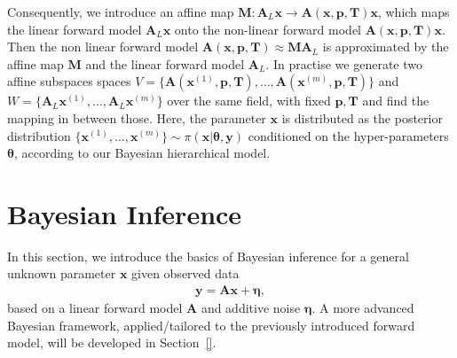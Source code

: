 Consequently, we introduce an affine map $ \bm{M}:\bm{A}_L \bm{x} \rightarrow \bm{A}(\bm{x},  \bm{p},\bm{T}) \bm{x}$, which maps the linear forward model $\bm{A}_L \bm{x}$ onto the non-linear forward model $\bm{A}(\bm{x},  \bm{p},\bm{T}) \bm{x}$.
Then the non linear forward model $\bm{A}(\bm{x},  \bm{p},\bm{T}) \approx \bm{M} \bm{A}_L$ is approximated by the affine map $\bm{M}$ and the linear forward model $\bm{A}_L$.
In practise we generate two affine subspaces spaces $V = \big\{ \bm{A}(\bm{x}^{(1)}, \bm{p,T}), \dots ,\bm{A}(\bm{x}^{(m)}, \bm{p,T})\big\} $ and $W = \big\{ \bm{A}_L\bm{x}^{(1)}, \dots ,\bm{A}_L\bm{x}^{(m)}\big\}$ over the same field, with fixed $\bm{p,T}$ and find the mapping in between those.
Here, the parameter $\bm{x}$ is distributed as the posterior distribution $\big\{  \bm{x}^{(1)} , \dots, \bm{x}^{(m)} \big\} \sim \pi(\bm{x}|\bm{\theta},\bm{y})$ conditioned on the hyper-parameters $\bm{\theta}$, according to our Bayesian hierarchical model.


\section{Bayesian Inference}
\label{sec:bayes}
In this section, we introduce the basics of Bayesian inference for a general unknown parameter $\bm{x}$ given observed data
\begin{align}
	\bm{y} = \bm{A} \bm{x} + \bm{\eta},
	\label{eq:LinDat}
\end{align}
based on a linear forward model $\bm{A}$ and additive noise $\bm{\eta}$.
A more advanced Bayesian framework, applied/tailored to the previously introduced forward model, will be developed in Section~\ref{}.


